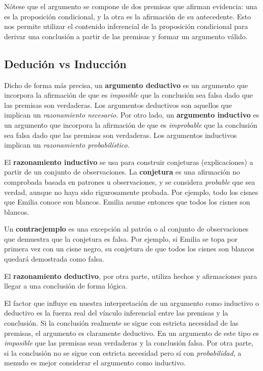 Nótese que el argumento se compone de dos premisas que afirman evidencia: una es la proposición condicional, y la otra es la afirmación de su antecedente. Esto nos permite utilizar el contenido inferencial de la proposición condicional para derivar una conclusión a partir de las premisas y formar un argumento válido.

\subsection{Dedución vs Inducción}

Dicho de forma más precisa, un \textbf{argumento deductivo} es un argumento que incorpora la afirmación de que es \textit{imposible} que la conclusión sea falsa dado que las premisas son verdaderas. Los argumentos deductivos son aquellos que implican un \textit{razonamiento necesario}. Por otro lado, un \textbf{argumento inductivo} es un argumento que incorpora la afirmación de que es \textit{improbable} que la conclusión sea falsa dado que las premisas son verdaderas. Los argumentos inductivos implican un \textit{razonamiento probabilístico}.

El \textbf{razonamiento inductivo} se usa para construir conjeturas (explicaciones) a partir de un conjunto de observaciones. La \textbf{conjetura} es una afirmación no comprobada basada en patrones u observaciones, y se considera \textit{probable} que sea verdad, aunque no haya sido rigurosamente probada. Por ejemplo, todo los cisnes que Emilia conoce son blancos. Emilia asume entonces que todos los cisnes son blancos. 

Un \textbf{contraejemplo} es una excepción al patrón o al conjunto de observaciones que demuestra que la conjetura es falsa. Por ejemplo, si Emilia se topa por primera vez con un cisne negro, su conjetura de que todos los cisnes son blancos quedará demostrada como falsa.

El \textbf{razonamiento deductivo}, por otra parte, utiliza hechos y afirmaciones para llegar a una conclusión de forma lógica. 

El factor que influye en nuestra interpretación de un argumento como inductivo o deductivo es la fuerza real del vínculo inferencial entre las premisas y la conclusión. Si la conclusión realmente se sigue con estricta necesidad de las premisas, el argumento es claramente deductivo. En un argumento de este tipo es \textit{imposible} que las premisas sean verdaderas y la conclusión falsa. Por otra parte, si la conclusión no se sigue con estricta necesidad pero sí con \textit{probabilidad}, a menudo es mejor considerar el argumento como inductivo.

